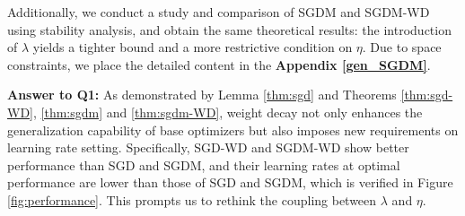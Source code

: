 \vspace{1em}




    
    
Additionally, we conduct a study and comparison of SGDM and SGDM-WD using stability analysis, and obtain the same theoretical results: the introduction of $\lambda$ yields a tighter bound and a more restrictive condition on $\eta$. Due to space constraints, we place the detailed content in the \textbf{Appendix \ref{gen_SGDM}}.

\textbf{Answer to Q1:} As demonstrated by Lemma \ref{thm:sgd} and Theorems \ref{thm:sgd-WD}, \ref{thm:sgdm} and \ref{thm:sgdm-WD}, weight decay not only enhances the generalization capability of base optimizers but also imposes new requirements on learning rate setting. Specifically, SGD-WD and SGDM-WD show better performance than SGD and SGDM, and their learning rates at optimal performance are lower than those of SGD and SGDM, which is verified in Figure \ref{fig:performance}. This prompts us to rethink the coupling between $\lambda$ and $\eta$.

